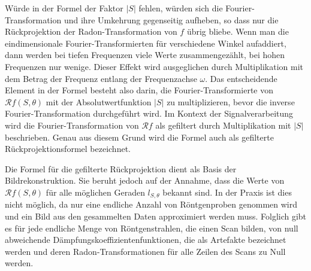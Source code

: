 Würde in der Formel der Faktor $|S|$ fehlen, würden sich die Fourier-Transformation und ihre Umkehrung gegenseitig aufheben, so dass nur die Rückprojektion der Radon-Transformation von $f$ übrig bliebe. Wenn man die eindimensionale Fourier-Transformierten für verschiedene Winkel aufaddiert, dann werden bei tiefen Frequenzen viele Werte zusammengezählt, bei hohen Frequenzen nur wenige. Dieser Effekt wird ausgeglichen durch Multiplikation mit dem Betrag der Frequenz entlang der Frequenzachse $\omega$. Das entscheidende Element in der Formel besteht also darin, die Fourier-Transformierte von $\mathscr{R}f(S, \theta)$ mit der Absolutwertfunktion $|S|$ zu multiplizieren, bevor die inverse Fourier-Transformation durchgeführt wird. Im Kontext der Signalverarbeitung wird die Fourier-Transformation von $\mathscr{R}f$ als gefiltert durch Multiplikation mit $|S|$ beschrieben. Genau aus diesem Grund wird die Formel auch als \glqq gefilterte Rückprojektionsformel\grqq{} bezeichnet.

Die Formel für die gefilterte Rückprojektion dient als Basis der Bildrekonstruktion. Sie beruht jedoch auf der Annahme, dass die Werte von $\mathscr{R}f(S, \theta)$ für alle möglichen Geraden $l_{S, \theta}$ bekannt sind. In der Praxis ist dies nicht möglich, da nur eine endliche Anzahl von Röntgenproben genommen wird und ein Bild aus den gesammelten Daten approximiert werden muss. Folglich gibt es für jede endliche Menge von Röntgenstrahlen, die einen Scan bilden, von null abweichende Dämpfungskoeffizientenfunktionen, die als Artefakte bezeichnet werden und deren Radon-Transformationen für alle Zeilen des Scans zu Null werden.




















